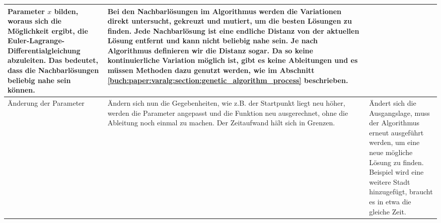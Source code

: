 \begin{xltabular}{\textwidth}{|L|X|X|}
   Parameter \(x\) bilden, woraus sich die Möglichkeit ergibt, die Euler-Lagrange-Differentialgleichung
   abzuleiten. Das bedeutet, dass die Nachbarlösungen beliebig nahe sein können.  
   & 
   Bei den Nachbarlösungen im Algorithmus werden die Variationen direkt untersucht,
   gekreuzt und mutiert, um die besten Lösungen zu finden. Jede Nachbarlösung 
   ist eine endliche Distanz von der aktuellen Lösung entfernt und kann nicht beliebig 
   nahe sein. Je nach Algorithmus definieren wir die Distanz sogar.
   Da so keine kontinuierliche Variation möglich ist, gibt es keine Ableitungen
   und es müssen Methoden dazu genutzt werden, wie im Abschnitt 
   \ref{buch:paper:varalg:section:genetic_algorithm_process} beschrieben.
   \\ \hline
   Änderung der Parameter
   & 
   Ändern sich nun die Gegebenheiten, wie z.B. der Startpunkt liegt neu höher, werden die Parameter 
   angepasst und die Funktion neu ausgerechnet, ohne die Ableitung noch einmal zu machen. Der Zeitaufwand
   hält sich in Grenzen.
   & 
   Ändert sich die Ausgangslage, muss der Algorithmus erneut ausgeführt werden, um eine
   neue mögliche Lösung zu finden. Beispiel wird eine weitere Stadt hinzugefügt, braucht
   es in etwa die gleiche Zeit.
   \\ \hline
\end{xltabular}
